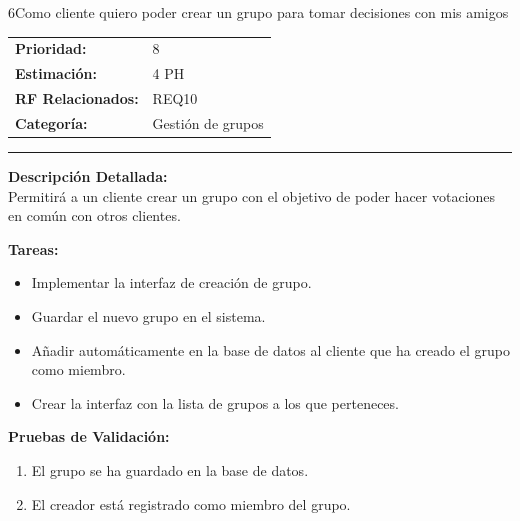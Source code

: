 \begin{hu_card}{6}{Como cliente quiero poder crear un grupo para tomar decisiones con mis amigos}
    \begin{tabularx}{\linewidth}{l X}
        \textbf{Prioridad:}   & 8\\
        \textbf{Estimación:}  & 4 PH \\
        \textbf{RF Relacionados:} & REQ10 \\
        \textbf{Categoría:} & Gestión de grupos \\
    \end{tabularx}

    \vspace{2mm}
    \hrule
    \vspace{2mm}

    \textbf{Descripción Detallada:} \\
    Permitirá a un cliente crear un grupo con el objetivo de poder hacer votaciones en común con otros clientes.

    \vspace{2mm}
    \textbf{Tareas:}
    \begin{itemize}[noitemsep, topsep=0pt]
        \item Implementar la interfaz de creación de grupo.
        \item Guardar el nuevo grupo en el sistema. 
        \item Añadir automáticamente en la base de datos al cliente que ha creado el grupo como miembro.
        \item Crear la interfaz con la lista de grupos a los que perteneces.
    \end{itemize}

    \vspace{2mm}
    \textbf{Pruebas de Validación:}
    \begin{enumerate}[noitemsep, topsep=0pt]
        \item El grupo se ha guardado en la base de datos.
        \item El creador está registrado como miembro del grupo.
    \end{enumerate}
\end{hu_card}

